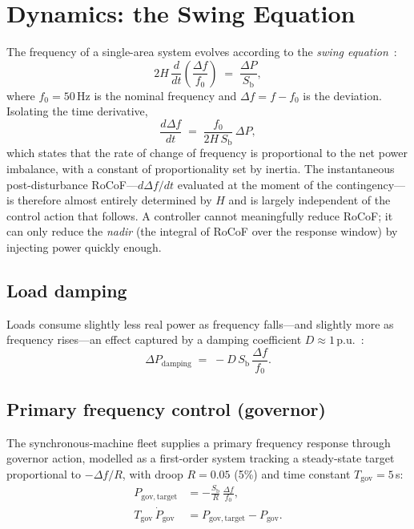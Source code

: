 \documentclass[conference]{IEEEtran}
\begin{document}
\section{Dynamics: the Swing Equation}\label{sec:swing}
The frequency of a single-area system evolves according to the \emph{swing equation}~\cite{kundur1994}:
\begin{equation}
2H\,\frac{d}{dt}\!\left(\frac{\Delta f}{f_0}\right) \;=\; \frac{\Delta P}{S_{\mathrm{b}}},
\label{eq:swing-pu}
\end{equation}
where $f_0 = 50$\,Hz is the nominal frequency and $\Delta f = f - f_0$ is the deviation. Isolating the time derivative,
\begin{equation}
\frac{d\Delta f}{dt} \;=\; \frac{f_0}{2 H\, S_{\mathrm{b}}}\,\Delta P,
\label{eq:swing-mw}
\end{equation}
which states that the rate of change of frequency is proportional to the net power imbalance, with a constant of proportionality set by inertia. The instantaneous post-disturbance RoCoF---$d\Delta f/dt$ evaluated at the moment of the contingency---is therefore almost entirely determined by $H$ and is largely independent of the control action that follows. A controller cannot meaningfully reduce RoCoF; it can only reduce the \emph{nadir} (the integral of RoCoF over the response window) by injecting power quickly enough.

\subsection{Load damping}
Loads consume slightly less real power as frequency falls---and slightly more as frequency rises---an effect captured by a damping coefficient $D \approx 1$\,p.u.~\cite{kundur1994}:
\begin{equation}
\Delta P_{\mathrm{damping}} \;=\; -D\,S_{\mathrm{b}}\,\frac{\Delta f}{f_0}.
\end{equation}

\subsection{Primary frequency control (governor)}
The synchronous-machine fleet supplies a primary frequency response through governor action, modelled as a first-order system tracking a steady-state target proportional to $-\Delta f / R$, with droop $R = 0.05$ (5\%) and time constant $T_{\mathrm{gov}} = 5$\,s:
\begin{align}
P_{\mathrm{gov,target}} &= -\frac{S_{\mathrm{b}}}{R}\,\frac{\Delta f}{f_0},\\
T_{\mathrm{gov}}\,\dot P_{\mathrm{gov}} &= P_{\mathrm{gov,target}} - P_{\mathrm{gov}}.
\end{align}
\end{document}
